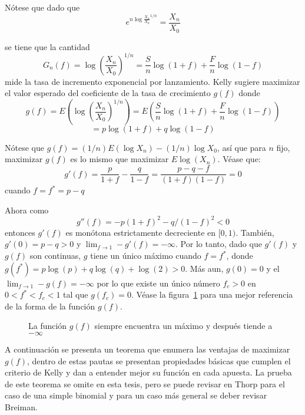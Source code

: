 Nótese que dado que
\[e^{n \log{\frac{X_n}{X_0}^{1/n}}} = \frac{X_n}{X_0}\]

se tiene que la cantidad
\[G_n(f) = \log{\left(\frac{X_n}{X_0}\right)^{1/n}} = \frac{S}{n}\log(1+f) + \frac{F}{n}\log(1-f)\]
mide la tasa de incremento exponencial por lanzamiento. Kelly sugiere maximizar el valor esperado del coeficiente de la tasa de crecimiento $g(f)$ donde
\[g(f) = E\left(\log\left(\frac{X_n}{X_0}\right)^{1/n}\right) = E\left({\frac{S}{n}\log(1+f) + \frac{F}{n}\log(1-f)}\right)\]
\[=p\log(1+f)+q\log(1-f)\]

Nótese que $g(f) = (1/n)E(\log{X_n})-(1/n)\log{X_0}$, así que para $n$ fijo, maximizar $g(f)$ es lo mismo que maximizar $E \log(X_n)$. Véase que:
\[g'(f) = \frac{p}{1+f} - \frac{q}{1-f} = \frac{p-q-f}{(1+f)(1-f)} = 0\]
cuando $f=f^* = p-q$

Ahora como
\[g''(f) = -p(1+f)^2 - q/(1-f)^2 < 0\]
 entonces $g'(f)$ es monótona estrictamente decreciente en $[0,1)$. También, $g'(0) =p -q >0$ y $\lim_{f\to1}-g'(f)=-\infty$. Por lo tanto, dado que $g'(f)$ y $g(f)$ son continuas, $g$ tiene un único máximo cuando $f=f^*$, donde $g(f^*) = p\log(p) + q\log(q) +\log(2) >0$. Más aun, $g(0)= 0$ y el $\lim_{f\to1}-g(f)=-\infty$ por lo que existe un único número $f_c>0$ en $0 < f^* < f_c < 1$ tal que $g(f_c)=0$. Véase la figura~\ref{Fig:Gf} para una mejor referencia de la forma de la función $g(f)$.
 
 \begin{figure}[!htb]\centering
    \begin {minipage}{0.65\textwidth}
      \caption{La función $g(f)$ siempre encuentra un máximo y después tiende a $-\infty$}\label{Fig:Gf}
    \end{minipage}
 \end{figure}
 
 A continuación se presenta un teorema que enumera las ventajas de maximizar $g(f)$, dentro de estas pautas se presentan propiedades básicas que cumplen el criterio de Kelly y dan a entender mejor su función en cada apuesta. La prueba de este teorema se omite en esta tesis, pero se puede revisar en Thorp\cite{thorp1969optimal} para el caso de una simple binomial y para un caso más general se deber revisar Breiman\cite{breiman1961optimal}.
 
